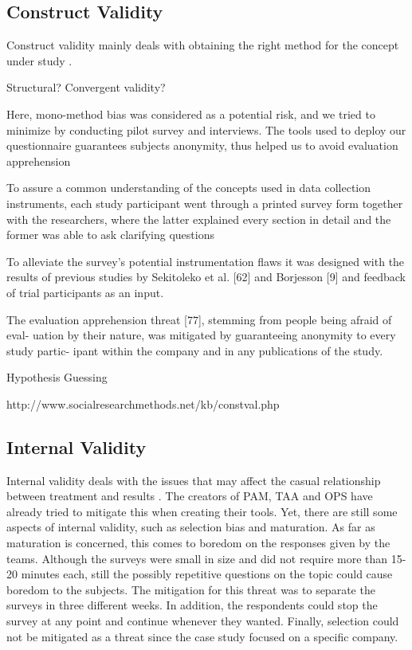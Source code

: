\subsection{Construct Validity}
Construct validity mainly deals with obtaining the right method for the concept under study \cite{Wohlin}.

Structural?
Convergent validity?

Here, mono-method bias was considered as a potential risk, and we tried
to minimize by conducting pilot survey and interviews. The tools used to deploy our questionnaire guarantees subjects anonymity, thus helped us to avoid evaluation apprehension

To assure a common understanding of the concepts used in data collection instruments, each study participant went through a printed survey form together with the researchers, where the latter explained every section in detail and the former was able to ask clarifying questions

To alleviate the survey’s potential instrumentation flaws it was designed with the results of previous studies by Sekitoleko et al. [62] and Borjesson [9] and feedback of trial participants as an input.

The evaluation apprehension threat [77], stemming from people being afraid of eval-
uation by their nature, was mitigated by guaranteeing anonymity to every study partic-
ipant within the company and in any publications of the study.

Hypothesis Guessing

http://www.socialresearchmethods.net/kb/constval.php


\subsection{Internal Validity}
Internal validity deals with the issues that may affect the casual relationship between treatment and results \cite{Wohlin}. The creators of \ac{PAM}, \ac{TAA} and \ac{OPS} have already tried to mitigate this when creating their tools. Yet, there are still some aspects of internal validity, such as selection bias and maturation. As far as maturation is concerned, this comes to boredom on the responses given by the teams. Although the surveys were small in size and did not require more than 15-20 minutes each, still the possibly repetitive questions on the topic could cause boredom to the subjects. The mitigation for this threat was to separate the surveys in three different weeks. In addition, the respondents could stop the survey at any point and continue whenever they wanted. Finally, selection could not be mitigated as a threat since the case study focused on a specific company.


